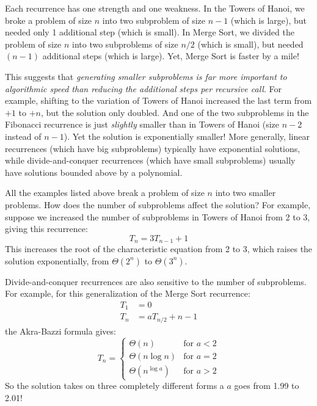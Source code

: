 Each recurrence has one strength and one weakness. In the Towers of
Hanoi, we broke a problem of size $n$ into two subproblem of size $n -
1$ (which is large), but needed only 1 additional step (which is
small). In Merge Sort, we divided the problem of size $n$ into two
subproblems of size $n/2$ (which is small), but needed $(n - 1)$
additional steps (which is large). Yet, Merge Sort is faster by a
mile!

This suggests that \emph{generating smaller subproblems is far more
  important to algorithmic speed than reducing the additional steps
  per recursive call}.  For example, shifting to the variation of
Towers of Hanoi increased the last term from $+1$ to $+n$, but the
solution only doubled.  And one of the two subproblems in the
Fibonacci recurrence is just \emph{slightly} smaller than in Towers of
Hanoi (size $n -2$ instead of $n-1$).  Yet the solution is
exponentially smaller!  More generally, linear recurrences (which have
big subproblems) typically have exponential solutions, while
divide-and-conquer recurrences (which have small subproblems) usually
have solutions bounded above by a polynomial.

All the examples listed above break a problem of size $n$ into two
smaller problems.  How does the number of subproblems affect the
solution?  For example, suppose we increased the number of subproblems
in Towers of Hanoi from 2 to 3, giving this recurrence:
\begin{equation*}
T_n = 3 T_{n-1} + 1
\end{equation*}
This increases the root of the characteristic equation from 2 to 3,
which raises the solution exponentially, from $\Theta(2^n)$ to
$\Theta(3^n)$.

Divide-and-conquer recurrences are also sensitive to the number of
subproblems.  For example, for this generalization of the Merge Sort
recurrence:
\begin{align*}
T_1 & = 0 \\
T_{n} & = a T_{n/2} + n - 1
\end{align*}
the Akra-Bazzi formula gives:
\begin{equation*}
T_n = \begin{cases}
\Theta(n) & \text{for $a < 2$} \\
\Theta(n \log n) & \text{for $a = 2$} \\
\Theta(n^{\log a}) & \text{for $a > 2$}
\end{cases}
\end{equation*}
So the solution takes on three completely different forms a $a$ goes
from 1.99 to 2.01!

